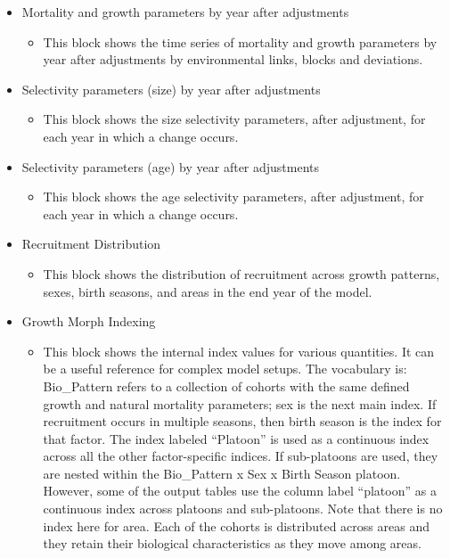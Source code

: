 \begin{itemize}
	\item Mortality and growth parameters by year after adjustments
	\begin{itemize}
		\item This block shows the time series of mortality and growth parameters by year after adjustments by environmental links, blocks and deviations.
	\end{itemize}
	\item Selectivity parameters (size) by year after adjustments
	\begin{itemize}
		\item This block shows the size selectivity parameters, after adjustment, for each year in which a change occurs.
	\end{itemize}
	\item Selectivity parameters (age) by year after adjustments
	\begin{itemize}
		\item This block shows the age selectivity parameters, after adjustment, for each year in which a change occurs.
	\end{itemize}
	\item Recruitment Distribution
	\begin{itemize}
		\item This block shows the distribution of recruitment across growth patterns, sexes, birth seasons, and areas in the end year of the model.
	\end{itemize}
	\item Growth Morph Indexing
	\begin{itemize}
		\item This block shows the internal index values for various quantities. It can be a useful reference for complex model setups. The vocabulary is: Bio\_Pattern refers to a collection of cohorts with the same defined growth and natural mortality parameters; sex is the next main index. If recruitment occurs in multiple seasons, then birth season is the index for that factor. The index labeled ``Platoon'' is used as a continuous index across all the other factor-specific indices. If sub-platoons are used, they are nested within the Bio\_Pattern x Sex x Birth Season platoon. However, some of the output tables use the column label ``platoon'' as a continuous index across platoons and sub-platoons. Note that there is no index here for area. Each of the cohorts is distributed across areas and they retain their biological characteristics as they move among areas.

\end{itemize}
\end{itemize}
